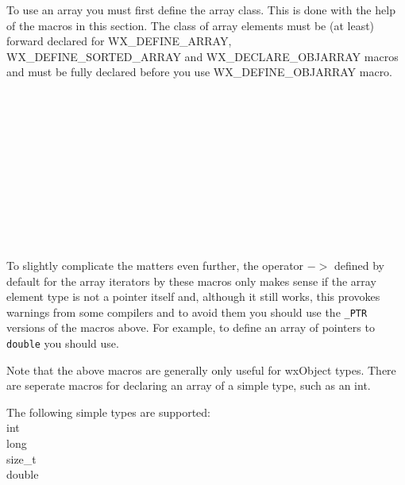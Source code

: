 
\label{arraymacros}

To use an array you must first define the array class. This is done with the
help of the macros in this section. The class of array elements must be (at
least) forward declared for WX\_DEFINE\_ARRAY, WX\_DEFINE\_SORTED\_ARRAY and
WX\_DECLARE\_OBJARRAY macros and must be fully declared before you use
WX\_DEFINE\_OBJARRAY macro.

\\
\\
\\
\\
\\
\\
\\
\\
\\
\\

To slightly complicate the matters even further, the operator $->$ defined by
default for the array iterators by these macros only makes sense if the array
element type is not a pointer itself and, although it still works, this
provokes warnings from some compilers and to avoid them you should use the 
{\tt \_PTR} versions of the macros above. For example, to define an array of
pointers to {\tt double} you should use.

Note that the above macros are generally only useful for 
wxObject types.  There are seperate macros for declaring an array of a simple type, 
such as an int.

The following simple types are supported:\\
int\\
long\\
size_t\\
double

